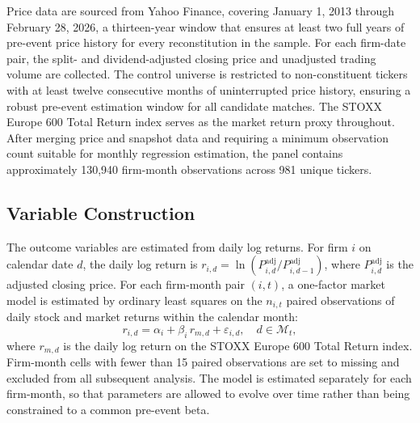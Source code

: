 \documentclass[12pt, a4paper]{article}
\begin{document}
Price data are sourced from Yahoo Finance, covering January 1, 2013 through February 28, 2026, a thirteen-year window that ensures at least two full years of pre-event price history for every reconstitution in the sample. For each firm-date pair, the split- and dividend-adjusted closing price and unadjusted trading volume are collected. The control universe is restricted to non-constituent tickers with at least twelve consecutive months of uninterrupted price history, ensuring a robust pre-event estimation window for all candidate matches. The STOXX Europe 600 Total Return index serves as the market return proxy throughout. After merging price and snapshot data and requiring a minimum observation count suitable for monthly regression estimation, the panel contains approximately 130,940 firm-month observations across 981 unique tickers.\\

\subsection{Variable Construction}
\label{sec:variables}

The outcome variables are estimated from daily log returns. For firm $i$ on calendar date $d$, the daily log return is $r_{i,d} = \ln(P^{\text{adj}}_{i,d} / P^{\text{adj}}_{i,d-1})$, where $P^{\text{adj}}_{i,d}$ is the adjusted closing price. For each firm-month pair $(i,t)$, a one-factor market model is estimated by ordinary least squares on the $n_{i,t}$ paired observations of daily stock and market returns within the calendar month:
\begin{equation}
    r_{i,d} = \alpha_i + \beta_i \, r_{m,d} + \varepsilon_{i,d}, \quad d \in \mathcal{M}_t, \label{eq:market_model}
\end{equation}
where $r_{m,d}$ is the daily log return on the STOXX Europe 600 Total Return index. Firm-month cells with fewer than 15 paired observations are set to missing and excluded from all subsequent analysis. The model is estimated separately for each firm-month, so that parameters are allowed to evolve over time rather than being constrained to a common pre-event beta.\\
\end{document}
